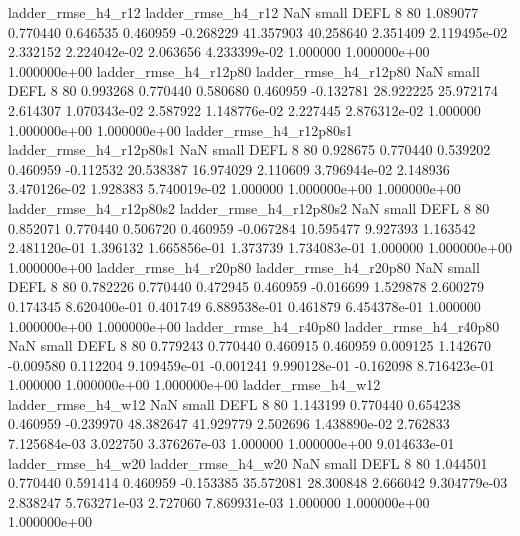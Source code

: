       ladder_rmse_h4_r12       ladder_rmse_h4_r12                   NaN      small     DEFL                 8 80 1.089077       0.770440 0.646535       0.460959   -0.268229     41.357903     40.258640     2.351409   2.119495e-02  2.332152 2.224042e-02     2.063656   4.233399e-02            1.000000    1.000000e+00        1.000000e+00
   ladder_rmse_h4_r12p80    ladder_rmse_h4_r12p80                   NaN      small     DEFL                 8 80 0.993268       0.770440 0.580680       0.460959   -0.132781     28.922225     25.972174     2.614307   1.070343e-02  2.587922 1.148776e-02     2.227445   2.876312e-02            1.000000    1.000000e+00        1.000000e+00
 ladder_rmse_h4_r12p80s1  ladder_rmse_h4_r12p80s1                   NaN      small     DEFL                 8 80 0.928675       0.770440 0.539202       0.460959   -0.112532     20.538387     16.974029     2.110609   3.796944e-02  2.148936 3.470126e-02     1.928383   5.740019e-02            1.000000    1.000000e+00        1.000000e+00
 ladder_rmse_h4_r12p80s2  ladder_rmse_h4_r12p80s2                   NaN      small     DEFL                 8 80 0.852071       0.770440 0.506720       0.460959   -0.067284     10.595477      9.927393     1.163542   2.481120e-01  1.396132 1.665856e-01     1.373739   1.734083e-01            1.000000    1.000000e+00        1.000000e+00
   ladder_rmse_h4_r20p80    ladder_rmse_h4_r20p80                   NaN      small     DEFL                 8 80 0.782226       0.770440 0.472945       0.460959   -0.016699      1.529878      2.600279     0.174345   8.620400e-01  0.401749 6.889538e-01     0.461879   6.454378e-01            1.000000    1.000000e+00        1.000000e+00
   ladder_rmse_h4_r40p80    ladder_rmse_h4_r40p80                   NaN      small     DEFL                 8 80 0.779243       0.770440 0.460915       0.460959    0.009125      1.142670     -0.009580     0.112204   9.109459e-01 -0.001241 9.990128e-01    -0.162098   8.716423e-01            1.000000    1.000000e+00        1.000000e+00
      ladder_rmse_h4_w12       ladder_rmse_h4_w12                   NaN      small     DEFL                 8 80 1.143199       0.770440 0.654238       0.460959   -0.239970     48.382647     41.929779     2.502696   1.438890e-02  2.762833 7.125684e-03     3.022750   3.376267e-03            1.000000    1.000000e+00        9.014633e-01
      ladder_rmse_h4_w20       ladder_rmse_h4_w20                   NaN      small     DEFL                 8 80 1.044501       0.770440 0.591414       0.460959   -0.153385     35.572081     28.300848     2.666042   9.304779e-03  2.838247 5.763271e-03     2.727060   7.869931e-03            1.000000    1.000000e+00        1.000000e+00
